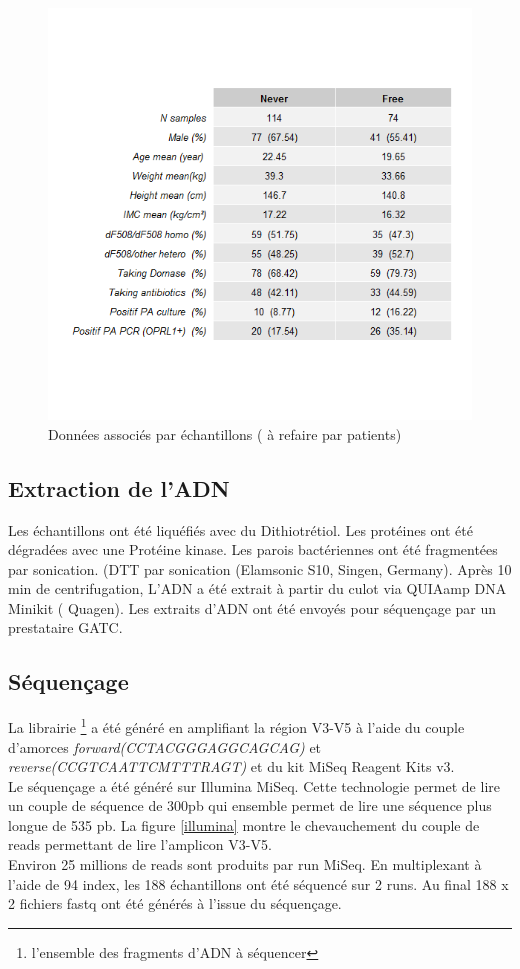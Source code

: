 \documentclass[12pt,a4paper]{article}
\begin{document}
\begin{figure}[ht]
\begin{center}
\includegraphics[scale=0.8]{img/summary.png}\hfill
\end{center}
\caption{Données associés par échantillons ( à refaire par patients)}
\label{summary}
\end{figure}



\subsection{Extraction de l’ADN}

Les échantillons ont été liquéfiés avec du Dithiotrétiol. Les protéines ont été dégradées avec une Protéine kinase.
Les parois bactériennes ont été fragmentées par sonication. (DTT par sonication (Elamsonic S10, Singen, Germany). Après 10 min de centrifugation, L’ADN a été extrait à partir du culot via QUIAamp DNA Minikit ( Quagen).
Les extraits d’ADN ont été envoyés pour séquençage par un prestataire GATC.

\subsection{Séquençage}
La librairie \footnote{l'ensemble des fragments d'ADN à séquencer} a été généré en amplifiant la région V3-V5 à l’aide du couple d’amorces  \textit{forward(CCTACGGGAGGCAGCAG)} et \textit{reverse(CCGTCAATTCMTTTRAGT)} et du kit MiSeq Reagent Kits v3. \\
Le séquençage a été généré sur Illumina MiSeq. Cette technologie permet de lire un couple de séquence de  300pb qui ensemble permet de lire une séquence plus longue de 535 pb. La figure \ref{illumina} montre le chevauchement du couple de reads permettant de lire l'amplicon V3-V5.\\
Environ 25 millions de reads sont produits par run MiSeq. En multiplexant à l’aide de 94 index, les 188 échantillons ont été séquencé sur 2 runs.
Au final 188 x 2 fichiers fastq ont été générés à l’issue du séquençage.
\end{document}
